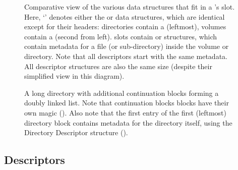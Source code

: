 
\begin{figure}
 \centering

 \caption[CFT Directory Entry data structures]{\label{fig:entry-ds} Comparative
   view of the various data structures that fit in a 's
    slot. Here, ‘’ denotes either the
    or  data structures, which are identical except
   for their headers: directories contain a  (leftmost), volumes
   contain a  (second from left).  slots contain
    or  structures, which contain metadata for a file
   (or sub-directory) inside the volume or directory. Note that all descriptors
   start with the same metadata. All descriptor structures are also the same
   size (despite their simplified view in this diagram).}
\end{figure}


\begin{figure}
 \centering

 \caption[CFT Directory Linked List]{\label{fig:fs-directory-ll} A long
   directory with additional  continuation blocks forming a
   doubly linked list. Note that continuation blocks blocks have their own
   magic (\magicDirectoryCont). Also note that the first entry of the first
   (leftmost) directory block contains metadata for the directory itself, using
   the Directory Descriptor structure (). }
\end{figure}

\subsection{Descriptors}

